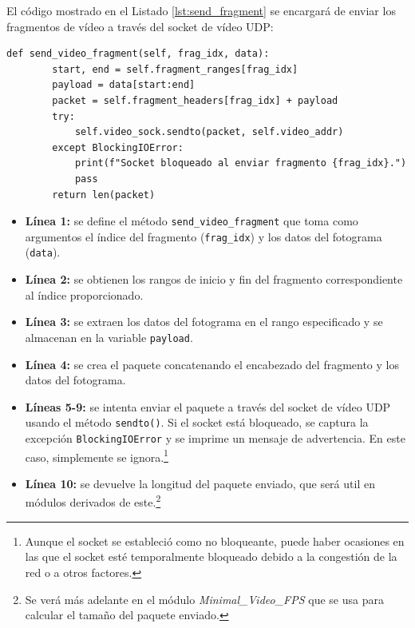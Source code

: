 El código mostrado en el Listado \ref{lst:send_fragment} se encargará de enviar los fragmentos de vídeo a través del socket de vídeo UDP:
\begin{lstlisting}[style=pythonstyle, caption={Método \texttt{send\_video\_fragment()} de \textit{Minimal\_Video}.}, label={lst:send_fragment}]
def send_video_fragment(self, frag_idx, data):
        start, end = self.fragment_ranges[frag_idx]
        payload = data[start:end]
        packet = self.fragment_headers[frag_idx] + payload
        try:
            self.video_sock.sendto(packet, self.video_addr)
        except BlockingIOError:
            print(f"Socket bloqueado al enviar fragmento {frag_idx}.")
            pass
        return len(packet)
\end{lstlisting}

\begin{itemize}
    \item \textbf{Línea 1:} se define el método \texttt{send\_video\_fragment} que toma como argumentos el índice del fragmento (\texttt{frag\_idx}) y los datos del fotograma (\texttt{data}).
    \item \textbf{Línea 2:} se obtienen los rangos de inicio y fin del fragmento correspondiente al índice proporcionado.
    \item \textbf{Línea 3:} se extraen los datos del fotograma en el rango especificado y se almacenan en la variable \texttt{payload}.
    \item \textbf{Línea 4:} se crea el paquete concatenando el encabezado del fragmento y los datos del fotograma.
    \item \textbf{Líneas 5-9:} se intenta enviar el paquete a través del socket de vídeo UDP usando el método \texttt{sendto()}. Si el socket está bloqueado, se captura la excepción \texttt{BlockingIOError} y se imprime un mensaje de advertencia. En este caso, simplemente se ignora.\footnote{Aunque el socket se estableció como no bloqueante, puede haber ocasiones en las que el socket esté temporalmente bloqueado debido a la congestión de la red o a otros factores.}
    \item \textbf{Línea 10:} se devuelve la longitud del paquete enviado, que será util en módulos derivados de este.\footnote{Se verá más adelante en el módulo \textit{Minimal\_Video\_FPS} que se usa para calcular el tamaño del paquete enviado.}
\end{itemize}
\vspace{\baselineskip}

